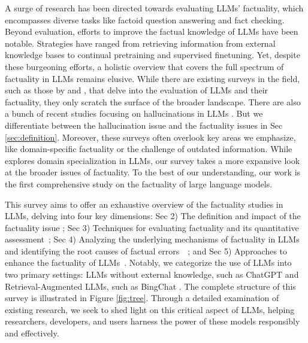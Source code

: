 A surge of research has been directed towards evaluating LLMs' factuality, which encompasses diverse tasks like factoid question answering and fact checking. Beyond evaluation, efforts to improve the factual knowledge of LLMs have been notable. Strategies have ranged from retrieving information from external knowledge bases to continual pretraining and supervised finetuning. Yet, despite these burgeoning efforts, a holistic overview that covers the full spectrum of factuality in LLMs remains elusive. 
While there are existing surveys in the field, such as those by \citet{chang2023survey} and \citet{aligning_llm_human}, that delve into the evaluation of LLMs and their factuality, they only scratch the surface of the broader landscape. There are also a bunch of recent studies focusing on hallucinations in LLMs \citep{rawte2023survey,zhang2023sirens,rawte2023survey,ye2023cognitive,Huang2023ASO}. But we differentiate between the hallucination issue and the factuality issues in Sec \ref{sec:definition}. Moreover, these surveys often overlook key areas we emphasize, like domain-specific factuality or the challenge of outdated information. While \citet{ling2023domain} explores domain specialization in LLMs, our survey takes a more expansive look at the broader issues of factuality.
To the best of our understanding, our work is the first comprehensive study on the factuality of large language models.

This survey aims to offer an exhaustive overview of the factuality studies in LLMs, delving into four key dimensions: Sec 2) The definition and impact of the factuality issue \citep{Pranshu2023,nori2023capabilities}; Sec 3) Techniques for evaluating factuality and its quantitative assessment~\citep{C-Eval, Min2023-FActScore}; Sec 4) Analyzing the underlying mechanisms of factuality in LLMs and identifying the root causes of factual errors~~\citep{liu2023lost, kotha2023understanding}; and Sec 5) Approaches to enhance the factuality of LLMs~\citep{multiagent_debate, he2022rethinking}. Notably, we categorize the use of LLMs into two primary settings: LLMs without external knowledge, such as ChatGPT \citep{chatgpt} and Retrieval-Augmented LLMs, such as BingChat \citep{BingChat}. The complete structure of this survey is illustrated in Figure \ref{fig:tree}.
Through a detailed examination of existing research, we seek to shed light on this critical aspect of LLMs, helping researchers, developers, and users harness the power of these models responsibly and effectively.